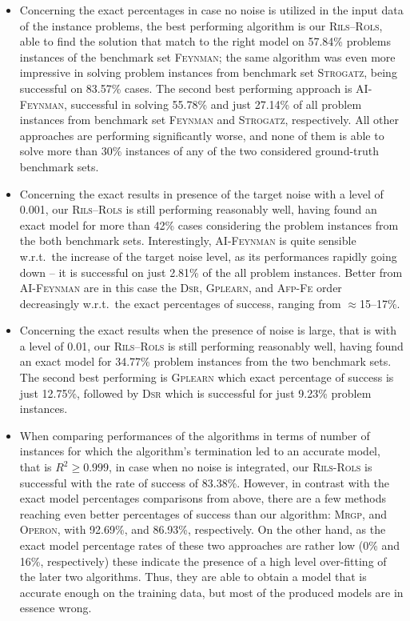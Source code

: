 \documentclass[a4paper,12pt]{elsarticle}
\begin{document}
\begin{itemize}
	\item Concerning the exact percentages in case no noise is utilized in the input data of the instance problems, the best performing algorithm is our \textsc{Rils}--\textsc{Rols}, able to find the solution that match to the right model on 57.84\% problems instances of the benchmark set \textsc{Feynman}; the same algorithm was even more impressive in solving problem instances from benchmark set \textsc{Strogatz}, being successful on 83.57\% cases. The second best performing  approach is \textsc{AI-Feynman}, successful in solving 55.78\% and just 27.14\% of all problem instances from benchmark set \textsc{Feynman} and \textsc{Strogatz}, respectively. All other approaches are performing significantly worse, and none of them is able to solve more than 30\% instances of any of the two considered ground-truth benchmark sets. 
	\item   Concerning the exact results in presence of the target noise with a level of 0.001, our \textsc{Rils}--\textsc{Rols} is still performing reasonably well, having found an exact model for more than 42\% cases considering the problem instances from the both benchmark sets. Interestingly, \textsc{AI-Feynman} is quite sensible w.r.t.\ the increase of the target noise level, as its performances rapidly going down -- it is successful on just 2.81\% of the all problem instances. Better from \textsc{AI-Feynman} are in this case the \textsc{Dsr}, \textsc{Gplearn}, and \textsc{Afp-Fe} order decreasingly w.r.t.\ the exact percentages of success, ranging from $\approx$15--17\%. 
	\item  Concerning the exact results when the presence of noise is large, that is with a level of 0.01,  our \textsc{Rils}--\textsc{Rols} is still performing reasonably well, having found an exact model for  34.77\% problem instances from the two benchmark sets. The second best performing is \textsc{Gplearn} which exact percentage of success is just 12.75\%, followed by \textsc{Dsr} which is successful for just 9.23\% problem instances. %
	
	\item When comparing performances of the algorithms in terms of number of instances for which the algorithm's termination led to an accurate model, that is $R^2 \geq 0.999$, in case when no noise is integrated, our \textsc{Rils}-\textsc{Rols} is successful with the rate of success of 83.38\%. However, in contrast with the exact model percentages comparisons from above, there are a few methods reaching even better percentages of success than our algorithm: \textsc{Mrgp}, and \textsc{Operon}, with 92.69\%, and 86.93\%, respectively. On the other hand, as the  exact model percentage rates of these two approaches are rather low (0\% and 16\%, respectively) these indicate the presence of a high level over-fitting  of the later two algorithms. Thus, they are able to obtain a model that is accurate enough on the training data, but most of the produced models are in essence wrong.
	

\end{itemize}
\end{document}
